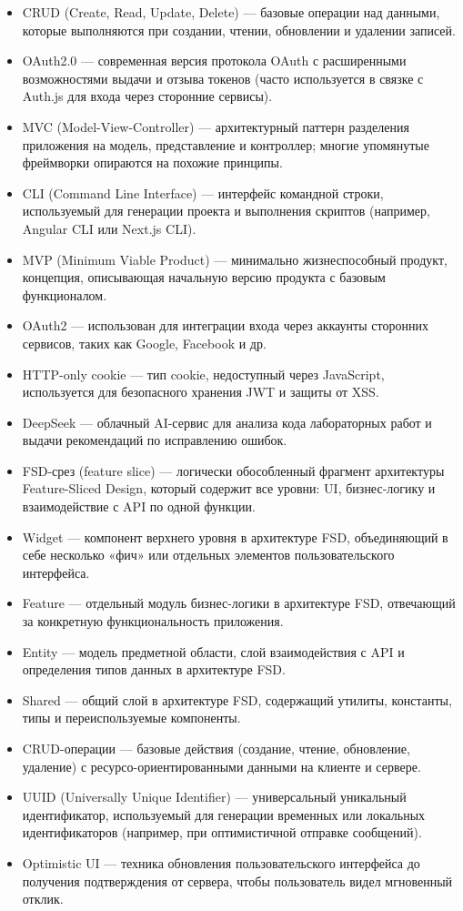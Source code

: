 \begin{itemize}
  \item CRUD (Create, Read, Update, Delete) — базовые операции над данными, которые выполняются при создании, чтении, обновлении и удалении записей.
  \item OAuth2.0 — современная версия протокола OAuth с расширенными возможностями выдачи и отзыва токенов (часто используется в связке с Auth.js для входа через сторонние сервисы).
  \item MVC (Model-View-Controller) — архитектурный паттерн разделения приложения на модель, представление и контроллер; многие упомянутые фреймворки опираются на похожие принципы.
  \item CLI (Command Line Interface) — интерфейс командной строки, используемый для генерации проекта и выполнения скриптов (например, Angular CLI или Next.js CLI).
  \item MVP (Minimum Viable Product) — минимально жизнеспособный продукт, концепция, описывающая начальную версию продукта с базовым функционалом.
  \item OAuth2 — использован для интеграции входа через аккаунты сторонних сервисов, таких как Google, Facebook и др.
  \item HTTP-only cookie — тип cookie, недоступный через JavaScript, используется для безопасного хранения JWT и защиты от XSS.
  \item DeepSeek — облачный AI-сервис для анализа кода лабораторных работ и выдачи рекомендаций по исправлению ошибок.
  \item FSD-срез (feature slice) — логически обособленный фрагмент архитектуры Feature-Sliced Design, который содержит все уровни: UI, бизнес-логику и взаимодействие с API по одной функции.
  \item Widget — компонент верхнего уровня в архитектуре FSD, объединяющий в себе несколько «фич» или отдельных элементов пользовательского интерфейса.
  \item Feature — отдельный модуль бизнес-логики в архитектуре FSD, отвечающий за конкретную функциональность приложения.
  \item Entity — модель предметной области, слой взаимодействия с API и определения типов данных в архитектуре FSD.
  \item Shared — общий слой в архитектуре FSD, содержащий утилиты, константы, типы и переиспользуемые компоненты.
  \item CRUD-операции — базовые действия (создание, чтение, обновление, удаление) с ресурсо-ориентированными данными на клиенте и сервере.
  \item UUID (Universally Unique Identifier) — универсальный уникальный идентификатор, используемый для генерации временных или локальных идентификаторов (например, при оптимистичной отправке сообщений).
  \item Optimistic UI — техника обновления пользовательского интерфейса до получения подтверждения от сервера, чтобы пользователь видел мгновенный отклик.
\end{itemize}

